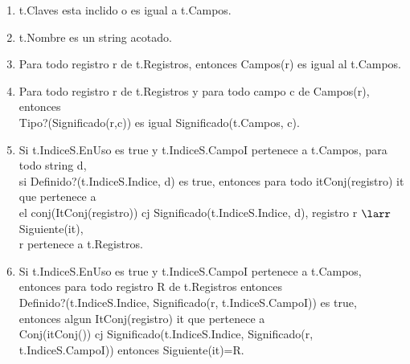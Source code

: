 \begin{enumerate}
\item	t.Claves esta inclido o es igual a t.Campos.
% 
\item	t.Nombre es un string acotado.
\item	Para todo registro r de t.Registros, entonces Campos(r) es igual al t.Campos.
\item	Para todo registro r de t.Registros y para todo campo c de Campos(r), entonces \\
Tipo?(Significado(r,c)) es igual Significado(t.Campos, c).

\item	Si t.IndiceS.EnUso es true y t.IndiceS.CampoI pertenece a t.Campos, para todo string d, \\
si Definido?(t.IndiceS.Indice, d) es true, entonces para todo itConj(registro) it que pertenece a \\
el conj(ItConj(registro)) cj Significado(t.IndiceS.Indice, d), registro r $\larr$Siguiente(it), \\
r pertenece a t.Registros.

\item	Si t.IndiceS.EnUso es true y t.IndiceS.CampoI pertenece a t.Campos, \\
entonces para todo registro R de t.Registros entonces \\
Definido?(t.IndiceS.Indice, Significado(r, t.IndiceS.CampoI)) es true, \\
entonces algun ItConj(registro) it que pertenece a \\
Conj(itConj()) cj Significado(t.IndiceS.Indice, Significado(r, t.IndiceS.CampoI)) entonces Siguiente(it)=R.


\end{enumerate}
